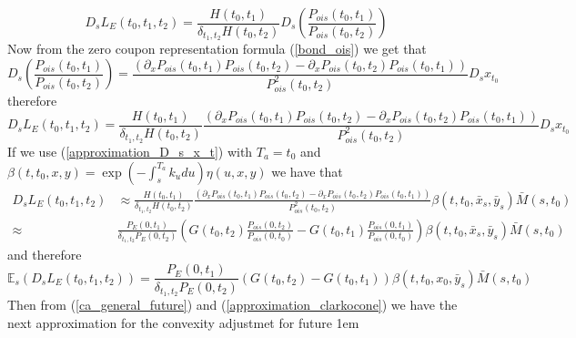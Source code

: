 \documentclass[a4paper,10pt]{article}
\newcommand{\1}{\mathbf{1}}
\begin{document}
\begin{equation*}
D_s L_{E}(t_0,t_1,t_2) = \frac{H(t_0,t_1)}{\delta_{t_1,t_2}H(t_0,t_2)} D_s \left(\frac{P_{ois}(t_0,t_1)}{P_{ois}(t_0,t_2)}\right) 
\end{equation*}
Now from the zero coupon representation formula (\ref{bond_ois}) we get that
\begin{equation*}
D_s \left(\frac{P_{ois}(t_0,t_1)}{P_{ois}(t_0,t_2)}\right) = \frac{\left(\partial_{x}P_{ois}(t_0,t_1)P_{ois}(t_0,t_2) - \partial_{x}P_{ois}(t_0,t_2) P_{ois}(t_0,t_1) \right)}{P^{2}_{ois}(t_0,t_2)} D_s x_{t_0}
\end{equation*}
therefore
\begin{equation}\label{malliavin_derive_L}
D_s L_{E}(t_0,t_1,t_2) = \frac{H(t_0,t_1)}{\delta_{t_1,t_2}H(t_0,t_2)}\frac{\left(\partial_{x}P_{ois}(t_0,t_1)P_{ois}(t_0,t_2) - \partial_{x}P_{ois}(t_0,t_2) P_{ois}(t_0,t_1) \right)}{P^{2}_{ois}(t_0,t_2)} D_s x_{t_0} 
\end{equation}
If we use (\ref{approximation_D_s_x_t}) with $T_a=t_0$ and $\beta(t,t_0,x,y) = \exp\left(-\int_{s}^{T_a}k_u du \right) \eta(u,x,y)$ we have that
\begin{align*}
D_s L_{E}(t_0,t_1,t_2) &\approx \frac{H(t_0,t_1)}{\delta_{t_1,t_2}H(t_0,t_2)}\frac{\left(\partial_{x}P_{ois}(t_0,t_1)P_{ois}(t_0,t_2) - \partial_{x}P_{ois}(t_0,t_2) P_{ois}(t_0,t_1) \right)}{P^{2}_{ois}(t_0,t_2)} \beta(t,t_0,\bar{x}_s,\bar{y}_s)\bar{M}(s,t_0) \nonumber \\
\approx& \frac{P_{E}(0,t_1)}{\delta_{t_1,t_2} P_{E}(0,t_2)} \left(G(t_0,t_2) \frac{P_{ois}(0,t_2)}{P_{ois}(0,t_0)} - G(t_0,t_1) \frac{P_{ois}(0,t_1)}{P_{ois}(0,t_0)} \right)\beta(t,t_0,\bar{x}_s,\bar{y}_s)\bar{M}(s,t_0)
\end{align*}
and therefore
\begin{equation}\label{approximation_clarkocone}
\mathbb{E}_s\left( D_s L_{E}(t_0,t_1,t_2) \right) = \frac{P_{E}(0,t_1)}{\delta_{t_1,t_2} P_{E}(0,t_2)} \left(G(t_0,t_2)  - G(t_0,t_1)\right)\beta(t,t_0,x_0,\bar{y}_s)\bar{M}(s,t_0)
\end{equation}
Then from (\ref{ca_general_future}) and (\ref{approximation_clarkocone}) we have the next approximation for the convexity adjustmet for future
\hspace{1cm}
\fboxsep1em
\end{document}
